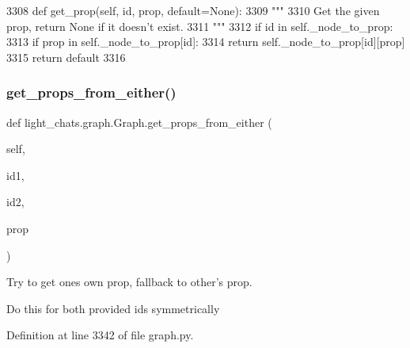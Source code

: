 \begin{DoxyCode}
3308     \textcolor{keyword}{def }get\_prop(self, id, prop, default=None):
3309         \textcolor{stringliteral}{"""}
3310 \textcolor{stringliteral}{        Get the given prop, return None if it doesn't exist.}
3311 \textcolor{stringliteral}{        """}
3312         \textcolor{keywordflow}{if} id \textcolor{keywordflow}{in} self.\_node\_to\_prop:
3313             \textcolor{keywordflow}{if} prop \textcolor{keywordflow}{in} self.\_node\_to\_prop[id]:
3314                 \textcolor{keywordflow}{return} self.\_node\_to\_prop[id][prop]
3315         \textcolor{keywordflow}{return} default
3316 
\end{DoxyCode}
\mbox{\label{classlight__chats_1_1graph_1_1Graph_ad12090e48ff11063ece35c115b91d2aa}} 
\subsubsection{\texorpdfstring{get\+\_\+props\+\_\+from\+\_\+either()}{get\_props\_from\_either()}}
{\footnotesize\ttfamily def light\+\_\+chats.\+graph.\+Graph.\+get\+\_\+props\+\_\+from\+\_\+either (\begin{DoxyParamCaption}\item[{}]{self,  }\item[{}]{id1,  }\item[{}]{id2,  }\item[{}]{prop }\end{DoxyParamCaption})}

\begin{DoxyVerb}Try to get ones own prop, fallback to other's prop.

Do this for both provided ids symmetrically
\end{DoxyVerb}
 

Definition at line 3342 of file graph.\+py.


